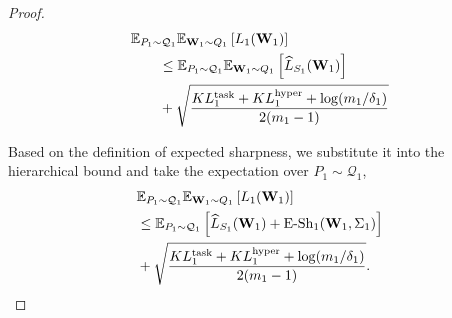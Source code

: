 \documentclass[letterpaper]{article} %
\begin{document}
\begin{proof}
\begin{equation}
\begin{aligned}
    &\mathbb{E}_{P_1 \sim \mathcal{Q}_1} \mathbb{E}_{\mathbf{W}_1 \sim Q_1} \left[ L_1(\mathbf{W}_1) \right]  \\
    &\qquad \leq \mathbb{E}_{P_1 \sim \mathcal{Q}_1} \mathbb{E}_{\mathbf{W}_1 \sim Q_1} \left[ \widehat{L}_{S_1}(\mathbf{W}_1) \right] \\
    &\qquad + \sqrt{\frac{KL^{\text{task}}_1 + KL^{\text{hyper}}_1 + \log(m_1/\delta_1)}{2(m_1 - 1)}} \notag
\end{aligned}
\end{equation}





Based on the definition of expected sharpness, we substitute it into the hierarchical bound and take the expectation over $P_1 \sim \mathcal{Q}_1$,   
\begin{equation}
\begin{aligned}
    &\mathbb{E}_{P_1 \sim \mathcal{Q}_1} \mathbb{E}_{\mathbf{W}_1 \sim Q_1} \left[ L_1(\mathbf{W}_1) \right]  \\
&\leq \mathbb{E}_{P_1 \sim \mathcal{Q}_1} \left[ \widehat{L}_{S_1}(\mathbf{W}_1)  + \mathrm{E\text{-}Sh}_1(\mathbf{W}_1, \Sigma_1) \right]  \\
&+ \sqrt{\frac{KL^{\text{task}}_1 + KL^{\text{hyper}}_1 + \log(m_1/\delta_1)}{2(m_1 - 1)}}.
\end{aligned}\notag
\end{equation}



\end{proof}
\end{document}
